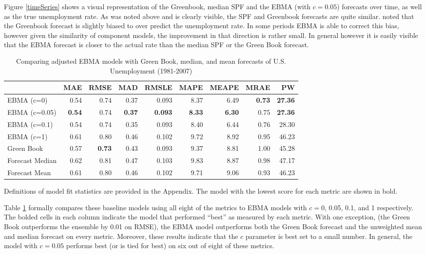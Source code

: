 \documentclass[12pt,fullpage,endnotes]{article}
\begin{document}
Figure \ref{timeSeries} shows a visual representation of the
Greenbook, median SPF and the EBMA (with $c=0.05$) forecasts over
time, as well as the true unemployment rate. As was noted above and is
clearly visible, the SPF and Greenbook forecasts are quite
similar. \citet{Baghestani:2008} noted that the Greenbook forecast is
slightly biased to over predict the unemployment rate. In some periods
EBMA is able to correct this bias, however given the similarity of
component models, the improvement in that direction is rather
small. In general however it is easily visible that the EBMA forecast
is closer to the actual rate than the median SPF or the Green Book
forecast.


\begin{table}[h]
\caption{Comparing adjusted EBMA models with Green Book, median, and mean forecasts of U.S. Unemployment (1981-2007)}
\begin{center}
\begin{tabular}{lrrrrrrrr}
\toprule
 & MAE & RMSE & MAD & RMSLE & MAPE & MEAPE & MRAE & PW \\ 
\midrule
 EBMA (c=0)& 0.54 & 0.74 & 0.37 & 0.093 & 8.37 & 6.49 & \textbf{0.73} & \textbf{27.36} \\ 
  EBMA (c=0.05)& \textbf{0.54} & 0.74 &\textbf{ 0.37} & \textbf{0.093} & \textbf{8.33} & \textbf{6.30} & 0.75 & \textbf{27.36} \\ 
 EBMA (c=0.1)& 0.54 & 0.74 & 0.35 & 0.093 & 8.40 & 6.44 & 0.76 & 28.30 \\ 
EBMA (c=1) & 0.61 & 0.80 & 0.46 & 0.102 & 9.72 & 8.92 & 0.95 & 46.23 \\ 
 Green Book& 0.57 & \textbf{0.73} & 0.43 & 0.093 & 9.37 & 8.81 & 1.00 & 45.28 \\ 
 Forecast Median& 0.62 & 0.81 & 0.47 & 0.103 & 9.83 & 8.87 & 0.98 & 47.17 \\ 
Forecast Mean& 0.61 & 0.80 & 0.46 & 0.102 & 9.71 & 9.06 & 0.93 & 46.23 \\ 
\bottomrule
\end{tabular}
\end{center}

\label{compareTable1}
 Definitions of model fit statistics are provided in the Appendix. The model with the lowest score for each metric are shown in bold.  
\end{table}


Table \ref{compareTable1} formally compares these baseline models
using all eight of the metrics to EBMA models with $c=$0, 0.05, 0.1,
and 1 respectively.  The bolded cells in each column indicate the
model that performed ``best'' as measured by each metric.  With one
exception, (the Green Book outperforms the ensemble by 0.01 on RMSE),
the EBMA model outperforms both the Green Book forecast and the
unweighted mean and median forecast on every metric.  Moreover, these
results indicate that the $c$ parameter is best set to a small number.
In general, the model with $c=0.05$ performs best (or is tied for
best) on six out of eight of these metrics.
\end{document}
